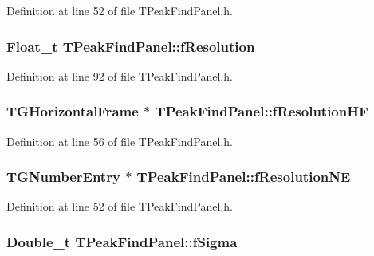 Definition at line 52 of file TPeakFindPanel.h.

\subsubsection[{fResolution}]{\setlength{\rightskip}{0pt plus 5cm}Float\_\-t {\bf TPeakFindPanel::fResolution}\hspace{0.3cm}{\ttfamily  [protected]}}\label{classTPeakFindPanel_a6665778f2b2a4629d3d7725da1f10ec4}


Definition at line 92 of file TPeakFindPanel.h.

\subsubsection[{fResolutionHF}]{\setlength{\rightskip}{0pt plus 5cm}TGHorizontalFrame $\ast$ {\bf TPeakFindPanel::fResolutionHF}\hspace{0.3cm}{\ttfamily  [private]}}\label{classTPeakFindPanel_acc966fc0c7fa132d0863212bdc11a38e}


Definition at line 56 of file TPeakFindPanel.h.

\subsubsection[{fResolutionNE}]{\setlength{\rightskip}{0pt plus 5cm}TGNumberEntry $\ast$ {\bf TPeakFindPanel::fResolutionNE}\hspace{0.3cm}{\ttfamily  [private]}}\label{classTPeakFindPanel_a9043e5dcdcf350b57b5198ef3e790a1d}


Definition at line 52 of file TPeakFindPanel.h.

\subsubsection[{fSigma}]{\setlength{\rightskip}{0pt plus 5cm}Double\_\-t {\bf TPeakFindPanel::fSigma}\hspace{0.3cm}{\ttfamily  [protected]}}\label{classTPeakFindPanel_ad969f6854bbc7fc38e2091d0975d50e2}


